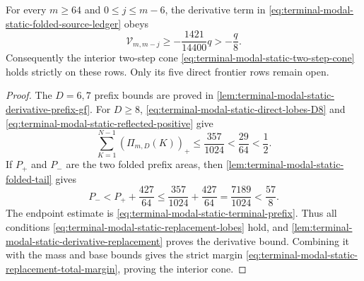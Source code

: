 \begin{theorem}
\label{thm:terminal-modal-static-derivative-replacement}
For every $m\ge64$ and $0\le j\le m-6$, the derivative term in
\eqref{eq:terminal-modal-static-folded-source-ledger} obeys
\[
 \mathcal V_{m,m-j}\ge-\frac{1421}{14400}q>-\frac q8.
\]
Consequently the interior two-step cone
\eqref{eq:terminal-modal-static-two-step-cone} holds strictly on these rows.
Only its five direct frontier rows remain open.
\end{theorem}

\begin{proof}
The $D=6,7$ prefix bounds are proved in
\cref{lem:terminal-modal-static-derivative-prefix-gf}.  For $D\ge8$,
\eqref{eq:terminal-modal-static-direct-lobes-D8} and
\eqref{eq:terminal-modal-static-reflected-positive} give
\[
 \sum_{K=1}^{N-1}(\Pi_{m,D}(K))_+
 \le\frac{357}{1024}<\frac{29}{64}<\frac12.
\]
If $P_+$ and $P_-$ are the two folded prefix areas, then
\cref{lem:terminal-modal-static-folded-tail} gives
\[
 P_-<P_++\frac{427}{64}
 \le\frac{357}{1024}+\frac{427}{64}
 =\frac{7189}{1024}<\frac{57}{8}.
\]
The endpoint estimate is
\eqref{eq:terminal-modal-static-terminal-prefix}.  Thus all conditions
\eqref{eq:terminal-modal-static-replacement-lobes} hold, and
\cref{lem:terminal-modal-static-derivative-replacement} proves the derivative
bound.  Combining it with the mass and base bounds gives the strict margin
\eqref{eq:terminal-modal-static-replacement-total-margin}, proving the
interior cone.
\end{proof}
